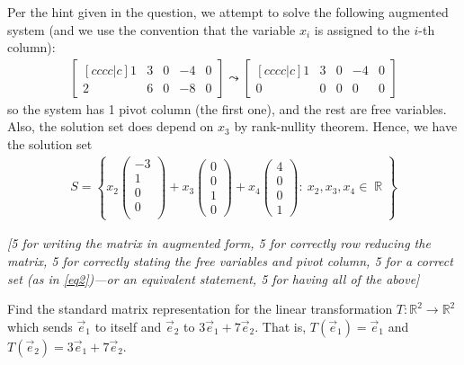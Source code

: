 \documentclass[answers,11pt]{exam}
\theoremstyle{definition}
\theoremstyle{definition}
\DeclareMathOperator{\R}{\mathbb{R}}
\DeclareMathOperator{\1}{\mathbbm{1}}
\newcommand{\condset}[4]{\left\{ #1  : \: #2 #3 #4 \right\}}
\begin{document}
\begin{questions}
\begin{solution}
	
	Per the hint given in the question, we attempt to solve the following augmented system (and we use the convention that the variable $x_i$ is assigned to the $i$-th column):
	\begin{align*}
	\begin{bmatrix}[c c c c | c]
	1 & 3 & 0 & -4 & 0 \\ 2 & 6 & 0 & -8 & 0
	\end{bmatrix} \leadsto \begin{bmatrix}[c c c c | c]
	1 & 3 & 0 & -4 & 0 \\ 0 & 0 & 0 & 0 & 0
	\end{bmatrix}
	\end{align*}
	so the system has 1 pivot column (the first one), and the rest are free variables. Also, the solution set does depend on $x_3$ by rank-nullity theorem. Hence, we have the solution set
	\begin{align}
	\label{eq2}
	\tag{$\ast$}
	S = \condset{ x_2 \begin{pmatrix} -3 \\ 1 \\ 0 \\ 0 \\\end{pmatrix} + x_3 \begin{pmatrix} 0 \\ 0 \\ 1 \\ 0 \end{pmatrix} + x_4 \begin{pmatrix} 4 \\ 0 \\ 0 \\ 1 \end{pmatrix} }{x_2, x_3, x_4}{ \in}{ \R}
	\end{align}
	
	
	\textit{[5 for writing the matrix in augmented form, 5 for \textit{correctly} row reducing the matrix, 5 for \textit{correctly} stating the free variables and pivot column, 5 for a correct set (as in \eqref{eq2})---or an equivalent statement, 5 for having all of the above]}
\end{solution}




\question[25] Find the standard matrix representation for the linear transformation $T:\mathbb{R}^2\to \mathbb{R}^2$ which sends $\vec{e}_1$ to itself and $\vec{e}_2$ to $3\vec{e}_1+7\vec{e}_2$. That is, $T(\vec{e}_1)=\vec{e}_1$ and $T(\vec{e}_2)=3\vec{e}_1+7\vec{e}_2$. 


\end{questions}
\end{document}
